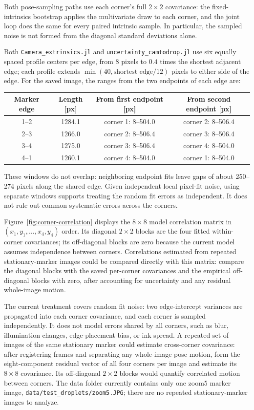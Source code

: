 \documentclass[11pt]{article}
\begin{document}
Both pose-sampling paths use each corner's full \(2\times2\) covariance:
the fixed-intrinsics bootstrap applies the multivariate draw to each
corner, and the joint loop does the same for every paired intrinsic sample.
In particular, the sampled noise is not formed from the diagonal standard
deviations alone.

Both \texttt{Camera\_extrinsics.jl} and
\texttt{uncertainty\_camtodrop.jl} use six equally spaced profile centers per
edge, from 8 pixels to \(0.4\) times the shortest adjacent edge; each profile
extends \(\min(40,\text{shortest edge}/12)\) pixels to either side of the
edge. For the saved image, the ranges from the two endpoints of each edge
are:
\begin{center}
  \small
  \begin{tabular}{c c c c}
    \toprule
    Marker edge & Length [px] & From first endpoint [px] &
    From second endpoint [px] \\
    \midrule
    1--2 & 1284.1 & corner 1: 8--504.0 & corner 2: 8--506.4 \\
    2--3 & 1266.0 & corner 2: 8--506.4 & corner 3: 8--506.4 \\
    3--4 & 1275.0 & corner 3: 8--506.4 & corner 4: 8--504.0 \\
    4--1 & 1260.1 & corner 4: 8--504.0 & corner 1: 8--504.0 \\
    \bottomrule
  \end{tabular}
\end{center}
These windows do not overlap: neighboring endpoint fits leave gaps of about
250--274 pixels along the shared edge. Given independent local pixel-fit
noise, using separate windows supports treating the random fit errors as
independent. It does not rule out common systematic errors across the
corners.

Figure~\ref{fig:corner-correlation} displays the \(8\times8\) model
correlation matrix in \((x_1,y_1,\ldots,x_4,y_4)\) order. Its diagonal
\(2\times2\) blocks are the four fitted within-corner covariances; its
off-diagonal blocks are zero because the current model assumes independence
between corners. Correlations estimated from repeated stationary-marker
images could be compared directly with this matrix: compare the diagonal
blocks with the saved per-corner covariances and the empirical
off-diagonal blocks with zero, after accounting for uncertainty and any
residual whole-image motion.

The current treatment covers random fit noise: two edge-intercept variances
are propagated into each corner covariance, and each corner is sampled
independently. It does not model errors shared by all corners, such as blur,
illumination changes, edge-placement bias, or ink spread. A repeated set of
images of the same stationary marker could estimate cross-corner covariance:
after registering frames and separating any whole-image pose motion, form
the eight-component residual vector of all four corners per image and
estimate its \(8\times8\) covariance. Its off-diagonal \(2\times2\) blocks
would quantify correlated motion between corners. The data folder currently
contains only one zoom5 marker image, \texttt{data/test\_droplets/zoom5.JPG};
there are no repeated stationary-marker images to analyze.
\end{document}
